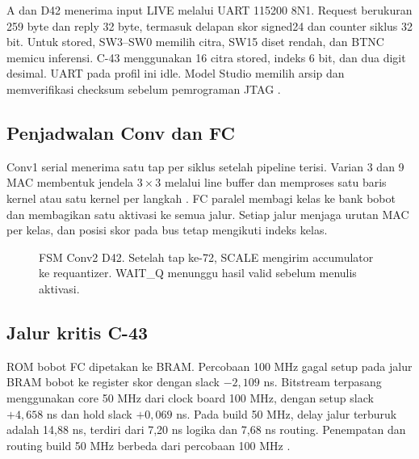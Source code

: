\documentclass[11pt,a4paper]{article}
\begin{document}
A dan D42 menerima input LIVE melalui UART 115200 8N1. Request berukuran
259 byte dan reply 32 byte, termasuk delapan skor signed24 dan counter
siklus 32 bit. Untuk stored, SW3--SW0 memilih citra, SW15 diset rendah,
dan BTNC memicu inferensi. C-43 menggunakan 16 citra stored, indeks
6 bit, dan dua digit desimal. UART pada profil ini idle. Model Studio
memilih arsip dan memverifikasi checksum sebelum pemrograman JTAG
\cite{repo}.

\subsection{Penjadwalan Conv dan FC}
Conv1 serial menerima satu tap per siklus setelah pipeline terisi.
Varian 3 dan 9 MAC membentuk jendela \(3\times3\) melalui line buffer
dan memproses satu baris kernel atau satu kernel per langkah
\cite{pr8}. FC paralel membagi kelas ke bank bobot dan membagikan satu
aktivasi ke semua jalur. Setiap jalur menjaga urutan MAC per kelas,
dan posisi skor pada bus tetap mengikuti indeks kelas.

\begin{figure}[H]
\centering
{}
\caption{FSM Conv2 D42. Setelah tap ke-72, SCALE mengirim accumulator ke requantizer. WAIT\_Q menunggu hasil valid sebelum menulis aktivasi.}
\end{figure}

\subsection{Jalur kritis C-43}
ROM bobot FC dipetakan ke BRAM. Percobaan 100 MHz gagal setup pada jalur
BRAM bobot ke register skor dengan slack \(-2{,}109\) ns. Bitstream
terpasang menggunakan core 50 MHz dari clock board 100 MHz, dengan setup
slack \(+4{,}658\) ns dan hold slack \(+0{,}069\) ns. Pada build 50 MHz,
delay jalur terburuk adalah 14,88 ns, terdiri dari 7,20 ns logika dan
7,68 ns routing. Penempatan dan routing build 50 MHz berbeda dari
percobaan 100 MHz \cite{repo}.
\end{document}
